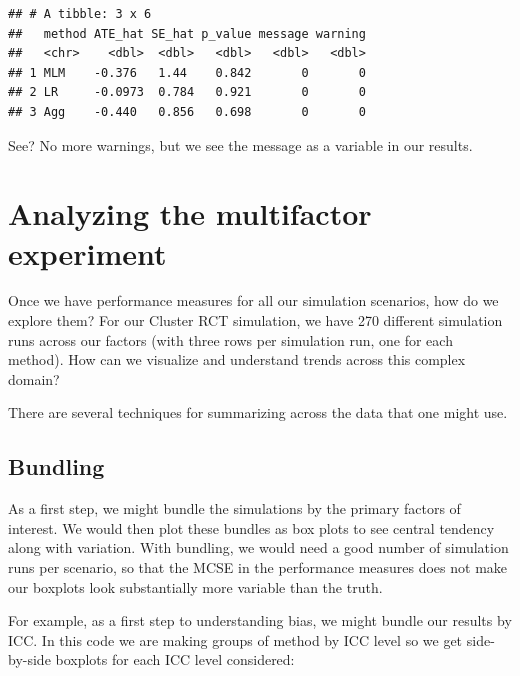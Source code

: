 \documentclass[
]{book}
\begin{document}
\begin{verbatim}
## # A tibble: 3 x 6
##   method ATE_hat SE_hat p_value message warning
##   <chr>    <dbl>  <dbl>   <dbl>   <dbl>   <dbl>
## 1 MLM    -0.376   1.44    0.842       0       0
## 2 LR     -0.0973  0.784   0.921       0       0
## 3 Agg    -0.440   0.856   0.698       0       0
\end{verbatim}

See? No more warnings, but we see the message as a variable in our results.

\hypertarget{analyzing-the-multifactor-experiment}{%
\chapter{Analyzing the multifactor experiment}\label{analyzing-the-multifactor-experiment}}

Once we have performance measures for all our simulation scenarios, how do we explore them?
For our Cluster RCT simulation, we have 270 different simulation runs across our factors (with three rows per simulation run, one for each method).
How can we visualize and understand trends across this complex domain?

There are several techniques for summarizing across the data that one might use.

\hypertarget{bundling}{%
\section{Bundling}\label{bundling}}

As a first step, we might bundle the simulations by the primary factors of interest.
We would then plot these bundles as box plots to see central tendency along with variation.
With bundling, we would need a good number of simulation runs per scenario, so that the MCSE in the performance measures does not make our boxplots look substantially more variable than the truth.

For example, as a first step to understanding bias, we might bundle our results by ICC.
In this code we are making groups of method by ICC level so we get side-by-side boxplots for each ICC level considered:
\end{document}
